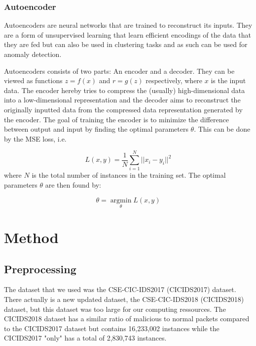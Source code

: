 \documentclass[]{article}
\begin{document}
 	 \subsubsection{Autoencoder}
 	  
 	  Autoencoders are neural networks that are trained to reconstruct its inputs. They are a form of unsupervised learning that learn efficient encodings of the data that they are fed but can also be used in clustering tasks and as such can be used for anomaly detection. 
 	  \newline
 	  
 	  \noindent
 	  Autoencoders consists of two parts: An encoder and a decoder. They can be viewed as functions $z = f(x)$ and $r = g(z)$ respectively, where $x$ is the input data. The encoder hereby tries to compress the (usually) high-dimensional data into a low-dimensional representation and the decoder aims to reconstruct the originally inputted data from the compressed data representation generated by the encoder. The goal of training the encoder is to minimize the difference between output and input by finding the optimal parameters $\theta$. This can be done by the MSE loss, i.e. 
 	  
 	  \begin{equation}
 	  	L(x, y) =  \frac{1}{N} \sum_{i=1}^{N} ||x_i - y_i ||^2
 	  \end{equation}
 	  where $N$ is the total number of instances in the training set. The optimal parameters $\theta$ are then found by:
 	  
 	  \begin{equation}
 	  	\theta = \operatorname*{argmin}_\theta
 	  	 L(x,y)
 	  \end{equation}
	 \section{Method}
	 
	 \subsection{Preprocessing}
	 The dataset that we used was the CSE-CIC-IDS2017 (CICIDS2017) dataset. There actually is a new updated dataset, the CSE-CIC-IDS2018 (CICIDS2018) dataset, but this dataset was too large for our computing ressources. The CICIDS2018 dataset has a similar ratio of malicious to normal packets compared to the CICIDS2017 dataset but contains 16,233,002 instances while the CICIDS2017 "only" has a total of 2,830,743 instances. 
	 
\end{document}
